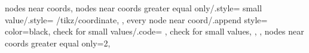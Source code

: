 nodes near coords,
    nodes near coords greater equal only/.style={
        small value/.style={
                /tikz/coordinate,
        },
    every node near coord/.append style={
        color=black,
        check for small values/.code={
        \begingroup
        \global\let\result=\pgfmathresult
        \endgroup
        \let\ONE=\pgfmathresult
        \ifx\result\ONE
        \fi
        },
        check for small values,
        },
    },
    nodes near coords greater equal only=2,

